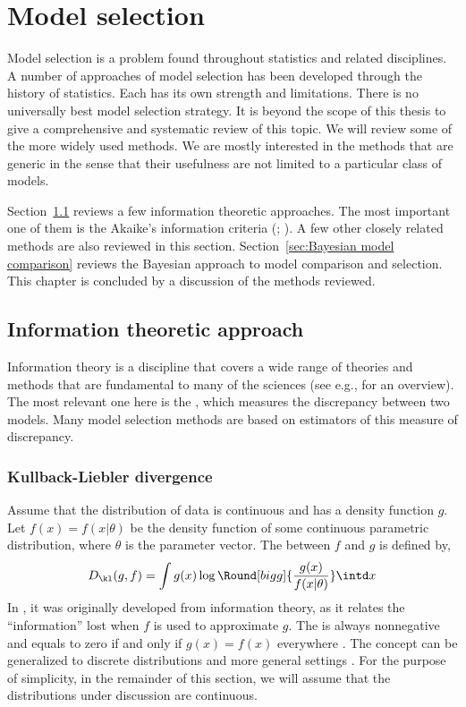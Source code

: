 \chapter{Model selection}
\label{cha:Model selection}

Model selection is a problem found throughout statistics and related
disciplines. A number of approaches of model selection has been developed
through the history of statistics. Each has its own strength and limitations.
There is no universally best model selection strategy. It is beyond the scope
of this thesis to give a comprehensive and systematic review of this topic. We
will review some of the more widely used methods. We are mostly interested in
the methods that are generic in the sense that their usefulness are not
limited to a particular class of models.

Section~\ref{sec:Information theoretic approach} reviews a few information
theoretic approaches. The most important one of them is the Akaike's
information criteria (\aic; \cite{Akaike:1973uc,Akaike:1974ih}). A few other
closely related methods are also reviewed in this section.
Section~\ref{sec:Bayesian model comparison} reviews the Bayesian approach to
model comparison and selection. This chapter is concluded by a discussion of
the methods reviewed.

\section{Information theoretic approach}
\label{sec:Information theoretic approach}

Information theory is a discipline that covers a wide range of theories and
methods that are fundamental to many of the sciences (see e.g.,
\cite{Cover:1991vx} for an overview). The most relevant one here is the \kld
\cite{Kullback:1951va}, which measures the discrepancy between two models.
Many model selection methods are based on estimators of this measure of
discrepancy.

\subsection{Kullback-Liebler divergence}
\label{sub:Kullback-Liebler divergence}

Assume that the distribution of data is continuous and has a density function
$g$. Let $f(x) = f(x|\theta)$ be the density function of some continuous
parametric distribution, where $\theta$ is the parameter vector. The \kld
between $f$ and $g$ is defined by,
\begin{equation}
  D_{\kl}(g,f) = \int g(x)\log\Round[bigg]{\frac{g(x)}{f(x|\theta)}}\intd x
  \label{eq:kl}
\end{equation}
In \cite{Kullback:1951va}, it was originally developed from information
theory, as it relates the ``information'' lost when $f$ is used to
approximate $g$. The \kld is always nonnegative and equals to zero if and
only if $g(x) = f(x)$ everywhere \cite[][sec.~6.8]{Burnham:2002wc}. The
concept can be generalized to discrete distributions and more general
settings \cite[][sec.~2.1.3]{Burnham:2002wc}. For the purpose of simplicity,
in the remainder of this section, we will assume that the distributions under
discussion are continuous.

